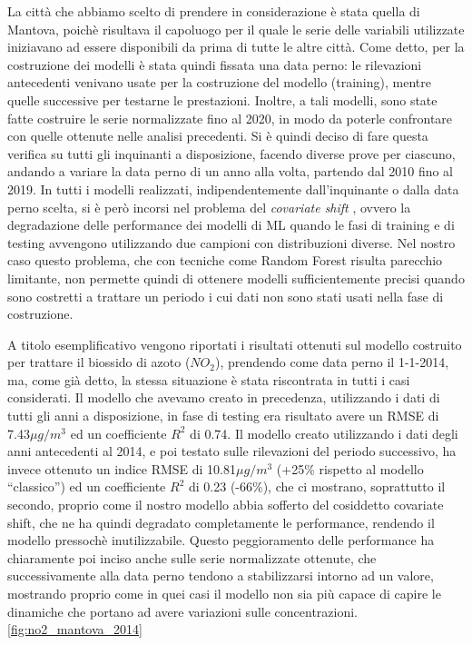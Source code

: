 \documentclass[a4paper]{report}
\begin{document}
La città che abbiamo scelto di prendere in considerazione è stata quella di Mantova, poichè risultava il capoluogo per il quale le serie delle variabili utilizzate iniziavano ad essere disponibili da prima di tutte le altre città. Come detto, per la costruzione dei modelli è stata quindi fissata una data perno: le rilevazioni antecedenti venivano usate per la costruzione del modello (training), mentre quelle successive per testarne le prestazioni. Inoltre, a tali modelli, sono state fatte costruire le serie normalizzate fino al 2020, in modo da poterle confrontare con quelle ottenute nelle analisi precedenti.  
Si è quindi deciso di fare questa verifica su tutti gli inquinanti a disposizione, facendo diverse prove per ciascuno, andando a variare la data perno di un anno alla volta, partendo dal 2010 fino al 2019.  
In tutti i modelli realizzati, indipendentemente dall'inquinante o dalla data perno scelta, si è però incorsi nel problema del \textit{covariate shift} \cite{quinonero2009dataset}, ovvero la degradazione delle performance dei modelli di ML quando le fasi di training e di testing avvengono utilizzando due campioni con distribuzioni diverse. Nel nostro caso questo problema, che con tecniche come Random Forest risulta parecchio limitante, non permette quindi di ottenere modelli sufficientemente precisi quando sono costretti a trattare un periodo i cui dati non sono stati usati nella fase di costruzione.

A titolo esemplificativo vengono riportati i risultati ottenuti sul modello costruito per trattare il biossido di azoto ($NO_2$), prendendo come data perno il 1-1-2014, ma, come già detto, la stessa situazione è stata riscontrata in tutti i casi considerati.
Il modello che avevamo creato in precedenza, utilizzando i dati di tutti gli anni a disposizione, in fase di testing era risultato avere un RMSE di 7.43$\mu g/m^3$ ed un coefficiente $R^2$ di 0.74.  
Il modello creato utilizzando i dati degli anni antecedenti al 2014, e poi testato sulle rilevazioni del periodo successivo, ha invece ottenuto un indice RMSE di 10.81$\mu g/m^3$ (+25\% rispetto al modello ``classico'') ed un coefficiente $R^2$ di 0.23 (-66\%), che ci mostrano, soprattutto il secondo, proprio come il nostro modello abbia sofferto del cosiddetto covariate shift, che ne ha quindi degradato completamente le performance, rendendo il modello pressochè inutilizzabile.  
Questo peggioramento delle performance ha chiaramente poi inciso anche sulle serie normalizzate ottenute, che successivamente alla data perno tendono a stabilizzarsi intorno ad un valore, mostrando proprio come in quei casi il modello non sia più capace di capire le dinamiche che portano ad avere variazioni sulle concentrazioni. \ref{fig:no2_mantova_2014}
\end{document}
